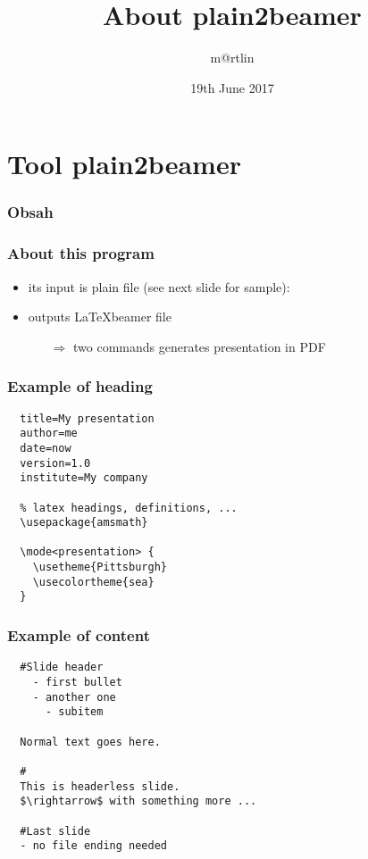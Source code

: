 \documentclass{beamer}
\title{About plain2beamer}
\author{m@rtlin}
\date{19th June 2017}
\institute{m@rtlin's}
\begin{document}
\begin{frame}	%
	\titlepage
\end{frame}

\section{Tool plain2beamer}
\begin{frame}	%
\frametitle{Obsah}
	\tableofcontents[]
\end{frame}

\begin{frame}	%
\frametitle{About this program}
\begin{itemize}
	\item its input is plain file (see next slide for sample):
	\item outputs \LaTeX beamer file
	\begin{itemize}
		\item[$\Rightarrow$] two commands generates presentation in PDF
	\end{itemize}
\end{itemize}
\end{frame}

\begin{frame}[fragile]	%
\frametitle{Example of heading}
\begin{verbatim}
  title=My presentation
  author=me
  date=now
  version=1.0
  institute=My company
 
  % latex headings, definitions, ...
  \usepackage{amsmath}
  
  \mode<presentation> {
    \usetheme{Pittsburgh}
    \usecolortheme{sea}
  }
\end{verbatim}
 
\end{frame}

\begin{frame}[fragile]	%
\frametitle{Example of content}
\begin{verbatim}
  #Slide header
    - first bullet
    - another one
      - subitem
  
  Normal text goes here.
  
  #
  This is headerless slide.
  $\rightarrow$ with something more ...
  
  #Last slide
  - no file ending needed
\end{verbatim}
\end{frame}
\end{document}
